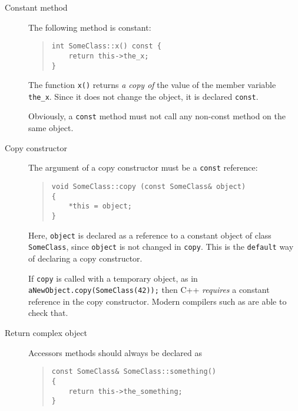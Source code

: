 \begin{description}
  
  
  \item[Constant method] The following method is constant:

  \begin{quote}
\begin{verbatim}
int SomeClass::x() const {
    return this->the_x;
}
\end{verbatim}
  \end{quote}
  
  The function \texttt{x()} returns \emph{a copy of} the value of
  the member variable \texttt{the\_x}.  Since it does not change
  the object, it is declared \texttt{const}.

  \begin{note}
    Obviously, a \texttt{const} method must not call any non-const 
    method on the same object.
  \end{note}

  
  \item[Copy constructor] The argument of a copy constructor must
  be a \texttt{const} reference:

  \begin{quote}
\begin{verbatim}
void SomeClass::copy (const SomeClass& object)
{
    *this = object;
}
\end{verbatim}
  \end{quote}
  
  Here, \texttt{object} is declared as a reference to a constant
  object of class \texttt{SomeClass}, since \texttt{object} is
  not changed in \texttt{copy}.  This is the \texttt{default} way
  of declaring a copy constructor.

  \begin{note}
    If \texttt{copy} is called with a temporary object, as in
    \texttt{aNewObject.copy(SomeClass(42));} then C++
    \emph{requires} a constant reference in the copy
    constructor.  Modern compilers such as are able to check
    that.
  \end{note}


  \item[Return complex object]
  Accessors methods should always be declared as
  
  \begin{quote}
\begin{verbatim}
const SomeClass& SomeClass::something()
{
    return this->the_something;
}
\end{verbatim}
  \end{quote}
  

\end{description}
